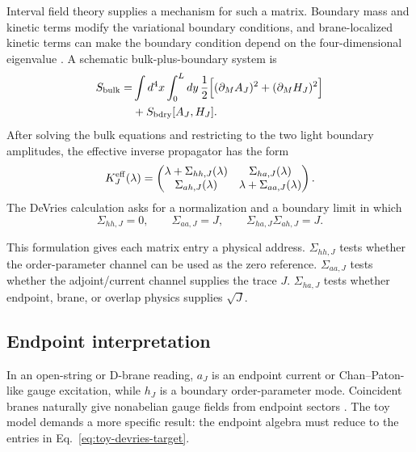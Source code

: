 Interval field theory supplies a mechanism for such a matrix.  Boundary mass and kinetic terms modify the variational boundary conditions, and brane-localized kinetic terms can make the boundary condition depend on the four-dimensional eigenvalue \cite{CsakiHubiszMeade2005}.  A schematic bulk-plus-boundary system is
\begin{equation}
  \begin{aligned}
  S_{\rm bulk}
  =
  &\int d^4x\int_0^Ldy\,
  \frac12\Big[(\partial_M A_J)^2+(\partial_M H_J)^2\Big]\\
  &+S_{\rm bdry}[A_J,H_J] .
  \end{aligned}
  \label{eq:bulk-boundary-action}
\end{equation}
After solving the bulk equations and restricting to the two light boundary amplitudes, the effective inverse propagator has the form
\begin{equation}
  K^{\rm eff}_J(\lambda)=
  \begin{pmatrix}
    \lambda+\Sigma_{hh,J}(\lambda) & \Sigma_{ha,J}(\lambda)\\
    \Sigma_{ah,J}(\lambda) & \lambda+\Sigma_{aa,J}(\lambda)
  \end{pmatrix}.
  \label{eq:effective-boundary-kernel}
\end{equation}
The DeVries calculation asks for a normalization and a boundary limit in which
\begin{equation}
  \Sigma_{hh,J}=0,\qquad
  \Sigma_{aa,J}=J,\qquad
  \Sigma_{ha,J}\Sigma_{ah,J}=J.
  \label{eq:self-energy-target}
\end{equation}

This formulation gives each matrix entry a physical address.  \(\Sigma_{hh,J}\) tests whether the order-parameter channel can be used as the zero reference.  \(\Sigma_{aa,J}\) tests whether the adjoint/current channel supplies the trace \(J\).  \(\Sigma_{ha,J}\) tests whether endpoint, brane, or overlap physics supplies \(\sqrt J\).

\subsection{Endpoint interpretation}

In an open-string or D-brane reading, \(a_J\) is an endpoint current or Chan--Paton-like gauge excitation, while \(h_J\) is a boundary order-parameter mode.  Coincident branes naturally give nonabelian gauge fields from endpoint sectors \cite{Polchinski1994,TongString}.  The toy model demands a more specific result: the endpoint algebra must reduce to the entries in Eq.~\eqref{eq:toy-devries-target}.

